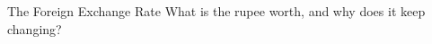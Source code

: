 \documentclass[11pt]{article}
\begin{document}
             {The Foreign Exchange Rate}
             {What is the rupee worth, and why does it keep changing?}






%  
%  
%  
%  
%  
%  



\end{document}
